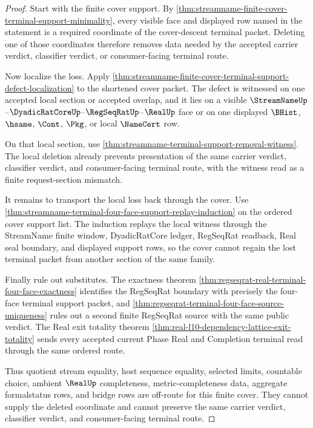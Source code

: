 \begin{proof}
Start with the finite cover support. By
\autoref{thm:streamname-finite-cover-terminal-support-minimality}, every
visible face and displayed row named in the statement is a required coordinate
of the cover-descent terminal packet. Deleting one of those coordinates
therefore removes data needed by the accepted carrier verdict, classifier
verdict, or consumer-facing terminal route.

Now localize the loss. Apply
\autoref{thm:streamname-finite-cover-terminal-support-defect-localization} to
the shortened cover packet. The defect is witnessed on one accepted local
section or accepted overlap, and it lies on a visible
$\StreamNameUp$--$\DyadicRatCoreUp$--$\RegSeqRatUp$--$\RealUp$ face or on one
displayed $\BHist$, $\hsame$, $\Cont$, $\Pkg$, or local $\NameCert$ row.

On that local section, use
\autoref{thm:streamname-terminal-support-removal-witness}. The local deletion
already prevents presentation of the same carrier verdict, classifier verdict,
and consumer-facing terminal route, with the witness read as a finite
request-section mismatch.

It remains to transport the local loss back through the cover. Use
\autoref{thm:streamname-terminal-four-face-support-replay-induction} on the
ordered cover support list. The induction replays the local witness through
the StreamName finite window, DyadicRatCore ledger, RegSeqRat readback, Real
seal boundary, and displayed support rows, so the cover cannot regain the lost
terminal packet from another section of the same family.

Finally rule out substitutes. The exactness theorem
\autoref{thm:regseqrat-real-terminal-four-face-exactness} identifies the
RegSeqRat boundary with precisely the four-face terminal support packet, and
\autoref{thm:regseqrat-terminal-four-face-source-uniqueness} rules out a
second finite RegSeqRat source with the same public verdict. The Real exit
totality theorem
\autoref{thm:real-l10-dependency-lattice-exit-totality} sends every accepted
current Phase Real and Completion terminal read through the same ordered
route.

Thus quotient stream equality, host sequence equality, selected limits,
countable choice, ambient $\RealUp$ completeness, metric-completeness data,
aggregate formalstatus rows, and bridge rows are off-route for this finite
cover. They cannot supply the deleted coordinate and cannot preserve the same
carrier verdict, classifier verdict, and consumer-facing terminal route.
\end{proof}

